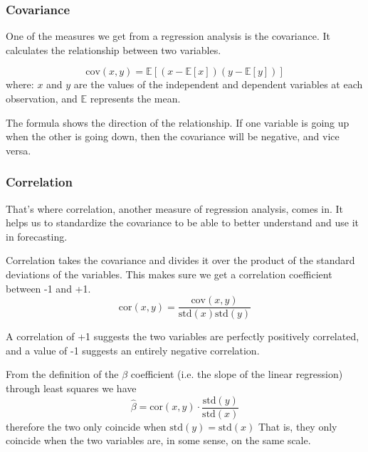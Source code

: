 \subsubsection{Covariance}
One of the measures we get from a regression analysis is the covariance. It calculates the relationship between two variables.

\begin{equation}
\textrm{cov}(x, y) = \mathbb{E}[(x - \mathbb{E}[x])(y - \mathbb{E}[y])]
\end{equation}
where: $x$ and $y$ are the values of the independent and dependent variables at each observation, and $\mathbb{E}$ represents the mean.

The formula shows the direction of the relationship. If one variable is going up when the other is going down, then the covariance will be negative, and vice versa.

\subsubsection{Correlation}
That’s where correlation, another measure of regression analysis, comes in. It helps us to standardize the covariance to be able to better understand and use it in forecasting.

Correlation takes the covariance and divides it over the product of the standard deviations of the variables. This makes sure we get a correlation coefficient between -1 and +1.
\begin{equation}
\textrm{cor}(x, y) = \frac{\textrm{cov}(x, y)}{\textrm{std}(x)\textrm{std}(y)}
\end{equation}

A correlation of +1 suggests the two variables are perfectly positively correlated, and a value of -1 suggests an entirely negative correlation.

From the definition of the $\beta$ coefficient (i.e. the slope of the linear regression) through least squares we have
\begin{equation}
\hat{\beta} = \textrm{cor}(x, y)\cdot \frac{\textrm{std}(y)}{\textrm{std}(x)}
\end{equation}
therefore the two only coincide when $\textrm{std}(y) = \textrm{std}(x)$ That is, they only coincide when the two variables are, in some sense, on the same scale. 

